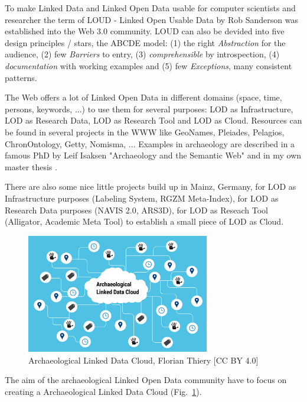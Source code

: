 \documentclass[twocolumn]{autart}
\begin{document}
To make Linked Data and Linked Open Data usable for computer scientists and researcher the term of LOUD - Linked Open Usable Data \cite{sanderson_loud} by Rob Sanderson was established into the Web 3.0 community. LOUD can also be devided into five design principles / stars, the ABCDE model: (1) the right \textit{Abstraction} for the audience, (2) few \textit{Barriers} to entry, (3) \textit{comprehensible} by introspection, (4) \textit{documentation} with working examples and (5) few \textit{Exceptions}, many consistent patterns.

The Web offers a lot of Linked Open Data in different domains (space, time, persons, keywords, ...) to use them for several purposes: LOD as Infrastructure, LOD as Research Data, LOD as Research Tool and LOD as Cloud. Resources can be found in several projects in the WWW like GeoNames, Pleiades, Pelagios, ChronOntology, Getty, Nomisma, ... Examples in archaeology are described in a famous PhD by Leif Isaksen "Archaeology and the Semantic Web" \cite{isaksen_archaeology} and in my own master thesis \cite{thiery_geinarfa}.

There are also some nice little projects build up in Mainz, Germany, for LOD as Infrastructure purposes (Labeling System, RGZM Meta-Index), for LOD as Research Data purposes (NAVIS 2.0, ARS3D), for LOD as Reseach Tool (Alligator, Academic Meta Tool) to establish a small piece of LOD as Cloud.

\begin{figure}[!htb]
\begin{center}
\includegraphics[width=8cm]{Archaeological_Linked_Data_Cloud_(ALDC).png}
\caption{Archaeological Linked Data Cloud, Florian Thiery [CC BY 4.0]}
\label{figaaldc}
\end{center}
\end{figure}

The aim of the archaeological Linked Open Data community have to focus on creating a Archaeological Linked Data Cloud (Fig.~\ref{figaaldc}).
\end{document}
